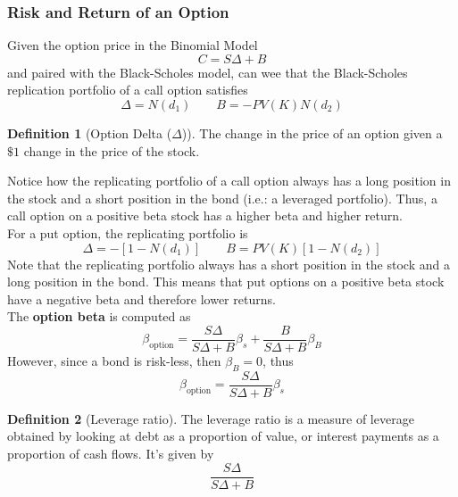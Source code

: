 \documentclass[11pt]{article}
\theoremstyle{definition}
\newtheorem*{definition}{Definition}
\begin{document}
\subsubsection{Risk and Return of an Option}
Given the option price in the Binomial Model 
\begin{equation*}
    C = S\Delta + B
\end{equation*}
and paired with the Black-Scholes model, can wee that the Black-Scholes replication portfolio of a call option satisfies 
\begin{equation*}
    \Delta = N(d_1) \qquad B = -PV(K)N(d_2)
\end{equation*}
\begin{definition}[Option Delta ($\Delta$)]
    The change in the price of an option given a $\$1$ change in the price of the stock.
\end{definition}
Notice how the replicating portfolio of a call option always has a long position in the stock and a short position in the bond (i.e.: a leveraged portfolio). Thus, a call option on a positive beta stock has a higher beta and higher return.\\
For a put option, the replicating portfolio is 
\begin{equation*}
    \Delta = -[1 - N(d_1)] \qquad B = PV(K)[1 - N(d_2)]
\end{equation*}
Note that the replicating portfolio always has a short position in the stock and a long position in the bond. This means that put options on a positive beta stock have a negative beta and therefore lower returns.\\
The \textbf{option beta} is computed as 
\begin{equation*}
    \beta_{\text{option}} = \frac{S\Delta}{S\Delta + B}\beta_s + \frac{B}{S\Delta + B}\beta_B
\end{equation*}
However, since a bond is risk-less, then $\beta_B = 0$, thus 
\begin{equation*}
    \beta_{\text{option}} = \frac{S\Delta}{S\Delta + B} \beta_s
\end{equation*}
\begin{definition}[Leverage ratio]
The leverage ratio is a measure of leverage obtained by looking at debt as a proportion of value, or interest payments as a proportion of cash flows. It's given by 
\begin{equation*}
    \frac{S\Delta}{S\Delta + B}
\end{equation*}
\end{definition}
\end{document}
